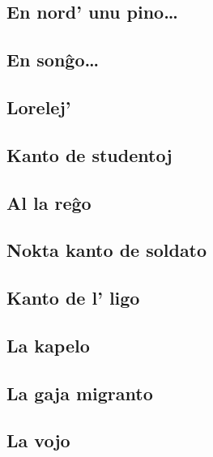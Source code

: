 \documentclass[a5paper,11pt,openany,twoside]{book}
\begin{document}
\subsection{En nord' unu pino\dots}
\label{unupino}


\subsection{En son\^go\dots}
\label{songxo}


\subsection{Lorelej'}
\label{lorelej}


\subsection{Kanto de studentoj}
\label{studentoj}


\subsection{Al la re\^go}
\label{regxo}


\subsection{Nokta kanto de soldato}
\label{soldato}


\subsection{Kanto de l' ligo}
\label{ligo}


\subsection{La kapelo}
\label{kapelo}


\subsection{La gaja migranto}
\label{migranto}


\subsection{La vojo}
\label{lavojo2}

\end{document}
